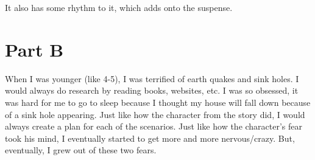 It also has some rhythm to it, which adds onto the suspense.


\newpage

\section*{Part B}
\label{sec:part_b}

When I was younger (like 4-5), I was terrified of earth quakes and sink holes. I
would always do research by reading books, websites, etc. I was so obsessed, it
was hard for me to go to sleep because I thought my house will fall down because
of a sink hole appearing. Just like how the character from the story did, I
would always create a plan for each of the scenarios. Just like how the
character's fear took his mind, I eventually started to get more and more
nervous/crazy. But, eventually, I grew out of these two fears.

